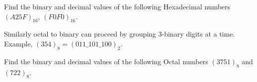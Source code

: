 \begin{prob}
  Find the binary and decimal values of the following Hexadecimal numbers
  $(A25F)_{16}$, $(F0F0)_{16}$.
\end{prob}
\vspace{10em}



Similarly octal to binary can proceed by grouping 3-binary digits at a time.
Example, $(354)_8 = (011\_101\_100)_2$.

\begin{prob}
  Find the binary and decimal values of the following Octal numbers
  $(3751)_8$ and $(722)_8$.
\end{prob}
\vspace{10em}